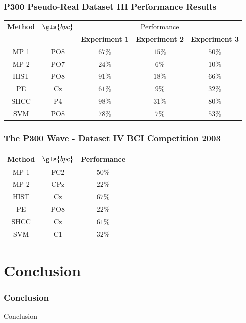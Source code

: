 \documentclass[aspectratio=169]{beamer}
\begin{document}
\begin{frame}
\frametitle{P300 Pseudo-Real Dataset III Performance Results }    
\begin{table}[h!]
\centering
\begin{tabular}{ccccc}
\toprule
\textbf{Method}	& \textbf{$\gls{bpc}$} &   \multicolumn{3}{c}{Performance} \\
 	&  &  \textbf{Experiment 1} & \textbf{Experiment 2}	& \textbf{Experiment 3}\\
\midrule
MP 1 & PO8  & $67\%$ & $15\%$ & $50\%$\\
MP 2 & PO7 & $24\%$ & $6\%$ & $10\%$\\
HIST  & PO8 & $91\%$ & $18\%$ & $66\%$\\
PE     & Cz & $61\%$ & $9\%$ & $32\%$\\
SHCC & P4 & $98\%$ & $31\%$ & $80\%$\\
SVM     & PO8  & $78\%$ & $7\%$ & $53\%$\\
\bottomrule
\end{tabular}
\label{tab:results}
\end{table}    
\end{frame} 

\begin{frame}
\frametitle{The P300 Wave - Dataset IV BCI Competition 2003 }    
\begin{table}[h!]
\centering
\begin{tabular}{ccc}
\toprule
\textbf{Method}	& \textbf{$\gls{bpc}$} &  \textbf{Performance} \\
\midrule
MP 1 & FC2  & $50\%$ \\
MP 2 & CPz & $22\%$ \\
HIST  & Cz & $67\%$ \\
PE     & PO8 & $22\%$ \\
SHCC & Cz & $61\%$ \\
SVM     & C1  & $32\%$ \\
\bottomrule
\end{tabular}
\label{tab:bcicompetitionresults}
\end{table}
\end{frame} 
    
    \section{Conclusion}
\begin{frame}
\frametitle{Conclusion}
\begin{center}
\LARGE Conclusion
\end{center}
\end{frame}
    
\end{document}
